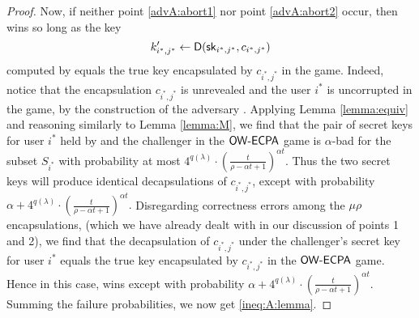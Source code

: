 \begin{proof}
  Now, if neither point \ref{advA:abort1} nor point \ref{advA:abort2} occur,
  then \advA wins so long as the key
  \[
  k_{i^{*},j^{*}}' \leftarrow \mathsf{D}(\mathsf{sk}_{i^{*},j^{*}}, c_{i^{*},j^{*}})
  \]
  computed by \advA equals the true key encapsulated by \(c_{i^{*},j^{*}}\) in the game.
  Indeed, notice that the encapsulation \(c_{i^{*},j^{*}}\) is unrevealed
  and the user \(i^{*}\) is uncorrupted in the \OWECPA game,
  by the construction of the adversary \advA.
  Applying Lemma \ref{lemma:equiv}
  and reasoning similarly to Lemma \ref{lemma:M},
  we find that the pair of secret keys for user \(i^{*}\) held by \advA
  and the challenger in the \(\mathsf{OW}\text{-}\mathsf{ECPA}\) game is
  \(\alpha\)-bad for the subset \(S_{i^{*}}\) with probability at most
  \(
    4^{q(\lambda)} \cdot \left( \frac{t}{\rho - \alpha t + 1} \right)^{\alpha t}.
  \)
  Thus the two secret keys will produce identical decapsulations of \(c_{i^{*},j^{*}}\), except with probability
  \(
    \alpha +
    4^{q(\lambda)} \cdot \left( \frac{t}{\rho - \alpha t + 1} \right)^{\alpha t}.
  \)
  Disregarding correctness errors among the \(\mu \rho\) encapsulations,
  (which we have already dealt with in our discussion of points 1 and 2),
  we find that the decapsulation of \(c_{i^{*},j^{*}}\)
  under the challenger's secret key for user \(i^{*}\)
  equals the true key encapsulated by \(c_{i^{*},j^{*}}\) in the \(\mathsf{OW}\text{-}\mathsf{ECPA}\) game.
  Hence in this case, \advA wins except with probability
  \(
  \alpha
  + 4^{q(\lambda)} \cdot \left( \frac{t}{\rho - \alpha t + 1} \right)^{\alpha t}.
  \)
  Summing the failure probabilities, we now get \eqref{ineq:A:lemma}.
\end{proof}


